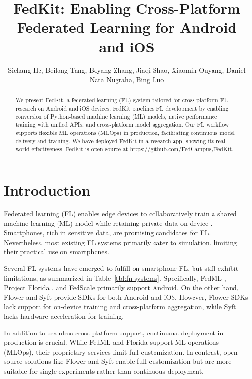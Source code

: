 \documentclass[letterpaper]{article} %
\title{FedKit: Enabling Cross-Platform Federated Learning for Android and iOS}
\author{
    Sichang He, Beilong Tang, Boyang Zhang,
    Jiaqi Shao,
    Xiaomin Ouyang,
    Daniel Nata Nugraha,
    Bing Luo
}
\begin{document}
\maketitle

\begin{abstract}
    We present FedKit, a federated learning (FL) system tailored for
    cross-platform FL research on Android and iOS devices.
    FedKit pipelines FL development by
    enabling conversion of Python-based machine learning (ML) models,
    native performance training with unified APIs,
    and cross-platform model aggregation.
    Our FL workflow supports flexible ML operations (MLOps) in production,
    facilitating continuous model delivery and training.
    We have deployed FedKit in a research app,
    showing its real-world effectiveness.
    FedKit is open-source at \url{https://github.com/FedCampus/FedKit}.
\end{abstract}

\section{Introduction}

Federated learning (FL) enables edge devices to
collaboratively train a shared machine learning (ML) model while
retaining private data on device \cite{mcmahan2017communication}.
Smartphones, rich in sensitive data,
are promising candidates for FL.
Nevertheless, most existing FL systems
\cite[e.g.,][]{bonawitz2019towards,liu2021fate,ma2019paddlepaddle,openfl_citation}
primarily cater to simulation,
limiting their practical use on smartphones.

Several FL systems have emerged to fulfill on-smartphone FL,
but still exhibit limitations,
as summarized in Table~\ref{tbl:fn-systems}.
Specifically, FedML \cite{he2020fedml},
Project Florida \cite{madrigal2023project},
and FedScale \cite{lai2022fedscale} primarily support Android.
On the other hand,
Flower \cite{beutel2020flower,mathur2021ondevice} and
Syft \cite{ryffel2018generic,Ziller2021,hall2021syft}
provide SDKs for both Android and iOS.
However, Flower SDKs lack support for on-device training and
cross-platform aggregation,
while Syft lacks hardware acceleration for training.

In addition to seamless cross-platform support,
continuous deployment in production is crucial.
While FedML and Florida support ML operations (MLOps),
their proprietary services limit full customization.
In contrast, open-source solutions like Flower and Syft enable
full customization
but are more suitable for single experiments rather than continuous deployment.
\end{document}
